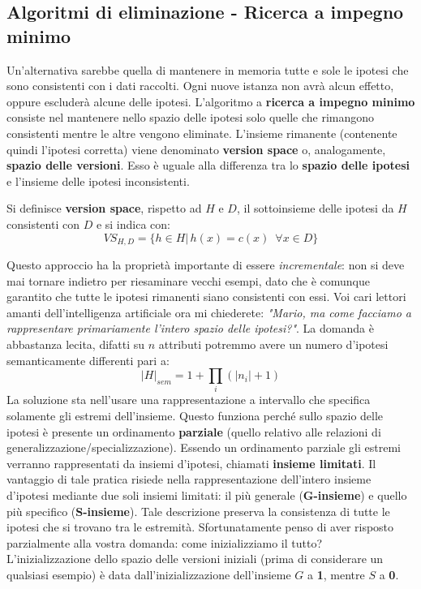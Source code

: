 \subsection{Algoritmi di eliminazione - Ricerca a impegno minimo}
Un'alternativa sarebbe quella di mantenere in memoria tutte e sole le ipotesi che sono consistenti con i dati raccolti. Ogni nuove istanza non avrà alcun effetto, oppure escluderà alcune delle ipotesi. L'algoritmo a \textbf{ricerca a impegno minimo} consiste nel mantenere nello spazio delle ipotesi solo quelle che rimangono consistenti mentre le altre vengono eliminate. L'insieme rimanente (contenente quindi l'ipotesi corretta) viene denominato \textbf{version space} o, analogamente, \textbf{spazio delle versioni}. Esso è uguale alla differenza tra lo \textbf{spazio delle ipotesi} e l'insieme delle ipotesi inconsistenti.
\begin{definizione}
  Si definisce \textbf{version space}, rispetto ad $H$ e $D$, il
  sottoinsieme delle ipotesi da $H$ consistenti con $D$ e si indica con:
  \[VS_{H, D}=\{h\in H|\, h(x) = c(x)\,\,\, \forall x \in D\}\]
\end{definizione}
Questo approccio ha la proprietà importante di essere \textit{incrementale}: non si deve mai tornare indietro per riesaminare vecchi esempi, dato che è comunque garantito che tutte le ipotesi rimanenti siano consistenti con essi. Voi cari lettori amanti dell'intelligenza artificiale ora mi chiederete: \textit{"Mario, ma come facciamo a rappresentare primariamente l'intero spazio delle ipotesi?"}. La domanda è abbastanza lecita, difatti su $n$ attributi potremmo avere un numero d'ipotesi semanticamente differenti pari a: 
 \[|H|_{sem}=1+\prod_{i}(|n_i|+1)\]
 La soluzione sta nell'usare una rappresentazione a intervallo che specifica solamente gli estremi dell'insieme. Questo funziona perché sullo spazio delle ipotesi è presente un ordinamento \textbf{parziale} (quello relativo alle relazioni di generalizzazione/specializzazione). Essendo un ordinamento parziale gli estremi verranno rappresentati da insiemi d'ipotesi, chiamati \textbf{insieme limitati}. Il vantaggio di tale pratica risiede nella rappresentazione dell'intero insieme d'ipotesi mediante due soli insiemi limitati: il più generale (\textbf{G-insieme}) e quello più specifico (\textbf{S-insieme}). Tale descrizione preserva la consistenza di tutte le ipotesi che si trovano tra le estremità. Sfortunatamente penso di aver risposto parzialmente alla vostra domanda: come inizializziamo il tutto? \\ L'inizializzazione dello spazio delle versioni iniziali (prima di considerare un qualsiasi esempio) è data dall'inizializzazione dell'insieme $G$ a \textbf{1}, mentre $S$ a \textbf{0}.\\
